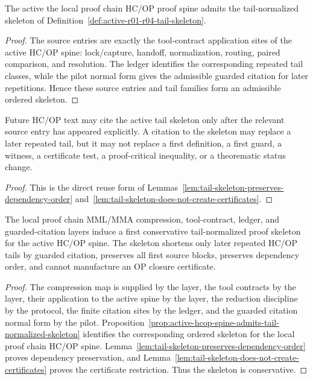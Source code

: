 \begin{proposition}
\label{prop:active-hcop-spine-admits-tail-normalized-skeleton}
The active the local proof chain HC/OP proof spine admits the tail-normalized skeleton of Definition~\ref{def:active-r01-r04-tail-skeleton}.
\end{proposition}

\begin{proof}
The source entries are exactly the tool-contract application sites of the active HC/OP spine: lock/capture, handoff, normalization, routing, paired comparison, and resolution. The ledger identifies the corresponding repeated tail classes, while the pilot normal form gives the admissible guarded citation for later repetitions. Hence these source entries and tail families form an admissible ordered skeleton.
\end{proof}

\begin{corollary}
\label{cor:tail-normalized-reuse-rule}
Future HC/OP text may cite the active tail skeleton only after the relevant source entry has appeared explicitly. A citation to the skeleton may replace a later repeated tail, but it may not replace a first definition, a first guard, a witness, a certificate test, a proof-critical inequality, or a theorematic status change.
\end{corollary}

\begin{proof}
This is the direct reuse form of Lemmas~\ref{lem:tail-skeleton-preserves-dependency-order} and~\ref{lem:tail-skeleton-does-not-create-certificates}.
\end{proof}

\begin{theorem}
\label{thm:first-tail-normalized-hcop-proof-skeleton}
The local proof chain MML/MMA compression, tool-contract, ledger, and guarded-citation layers induce a first conservative tail-normalized proof skeleton for the active HC/OP spine. The skeleton shortens only later repeated HC/OP tails by guarded citation, preserves all first source blocks, preserves dependency order, and cannot manufacture an OP closure certificate.
\end{theorem}

\begin{proof}
The compression map is supplied by the layer, the tool contracts by the layer, their application to the active spine by the layer, the reduction discipline by the protocol, the finite citation sites by the ledger, and the guarded citation normal form by the pilot. Proposition~\ref{prop:active-hcop-spine-admits-tail-normalized-skeleton} identifies the corresponding ordered skeleton for the local proof chain HC/OP spine. Lemma~\ref{lem:tail-skeleton-preserves-dependency-order} proves dependency preservation, and Lemma~\ref{lem:tail-skeleton-does-not-create-certificates} proves the certificate restriction. Thus the skeleton is conservative.
\end{proof}


